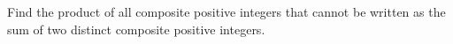 Find the product of all composite positive integers that cannot be written as the sum of two distinct composite positive integers.
